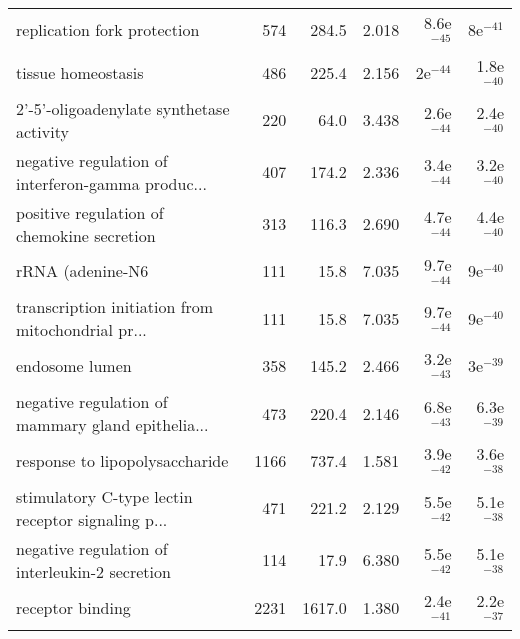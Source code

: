 \begin{longtable}{lrrrrr}
                       replication fork protection &                     574 &                   284.5 &      2.018 &         8.6e$^{-45}$ &           8e$^{-41}$ \\
                                tissue homeostasis &                     486 &                   225.4 &      2.156 &           2e$^{-44}$ &         1.8e$^{-40}$ \\
          2'-5'-oligoadenylate synthetase activity &                     220 &                    64.0 &      3.438 &         2.6e$^{-44}$ &         2.4e$^{-40}$ \\
 negative regulation of interferon-gamma produc... &                     407 &                   174.2 &      2.336 &         3.4e$^{-44}$ &         3.2e$^{-40}$ \\
        positive regulation of chemokine secretion &                     313 &                   116.3 &      2.690 &         4.7e$^{-44}$ &         4.4e$^{-40}$ \\
                                  rRNA (adenine-N6 &                     111 &                    15.8 &      7.035 &         9.7e$^{-44}$ &           9e$^{-40}$ \\
 transcription initiation from mitochondrial pr... &                     111 &                    15.8 &      7.035 &         9.7e$^{-44}$ &           9e$^{-40}$ \\
                                    endosome lumen &                     358 &                   145.2 &      2.466 &         3.2e$^{-43}$ &           3e$^{-39}$ \\
 negative regulation of mammary gland epithelia... &                     473 &                   220.4 &      2.146 &         6.8e$^{-43}$ &         6.3e$^{-39}$ \\
                    response to lipopolysaccharide &                    1166 &                   737.4 &      1.581 &         3.9e$^{-42}$ &         3.6e$^{-38}$ \\
 stimulatory C-type lectin receptor signaling p... &                     471 &                   221.2 &      2.129 &         5.5e$^{-42}$ &         5.1e$^{-38}$ \\
    negative regulation of interleukin-2 secretion &                     114 &                    17.9 &      6.380 &         5.5e$^{-42}$ &         5.1e$^{-38}$ \\
                                  receptor binding &                    2231 &                  1617.0 &      1.380 &         2.4e$^{-41}$ &         2.2e$^{-37}$ \\

\end{longtable}
